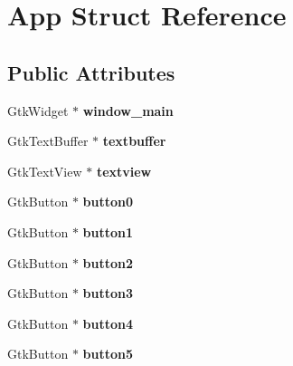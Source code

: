 \hypertarget{structApp}{\section{App Struct Reference}
\label{structApp}
}
\subsection*{Public Attributes}
\begin{DoxyCompactItemize}
\item 
\hypertarget{structApp_a855f0958ce21954f138dfc2bf2191fed}{Gtk\+Widget $\ast$ {\bfseries window\+\_\+main}}\label{structApp_a855f0958ce21954f138dfc2bf2191fed}

\item 
\hypertarget{structApp_aaabdebe544b4e984c3b39e2b67096c18}{Gtk\+Text\+Buffer $\ast$ {\bfseries textbuffer}}\label{structApp_aaabdebe544b4e984c3b39e2b67096c18}

\item 
\hypertarget{structApp_a611c4377e1409da7e8c01d024ba074a6}{Gtk\+Text\+View $\ast$ {\bfseries textview}}\label{structApp_a611c4377e1409da7e8c01d024ba074a6}

\item 
\hypertarget{structApp_a2c4d25f7b0b347761c08fbbafa367adf}{Gtk\+Button $\ast$ {\bfseries button0}}\label{structApp_a2c4d25f7b0b347761c08fbbafa367adf}

\item 
\hypertarget{structApp_a457b53d978fe60c7e293f389381e4698}{Gtk\+Button $\ast$ {\bfseries button1}}\label{structApp_a457b53d978fe60c7e293f389381e4698}

\item 
\hypertarget{structApp_a6006c2ea653c6dbad63f3f604c0f6665}{Gtk\+Button $\ast$ {\bfseries button2}}\label{structApp_a6006c2ea653c6dbad63f3f604c0f6665}

\item 
\hypertarget{structApp_a6c97c284b3cea236b34907ff3b1af973}{Gtk\+Button $\ast$ {\bfseries button3}}\label{structApp_a6c97c284b3cea236b34907ff3b1af973}

\item 
\hypertarget{structApp_ad97652383fa14194f30a07c6ac3a75a4}{Gtk\+Button $\ast$ {\bfseries button4}}\label{structApp_ad97652383fa14194f30a07c6ac3a75a4}

\item 
\hypertarget{structApp_a4d5a595f56f180b9ac551b8d44637e7b}{Gtk\+Button $\ast$ {\bfseries button5}}\label{structApp_a4d5a595f56f180b9ac551b8d44637e7b}


\end{DoxyCompactItemize}

